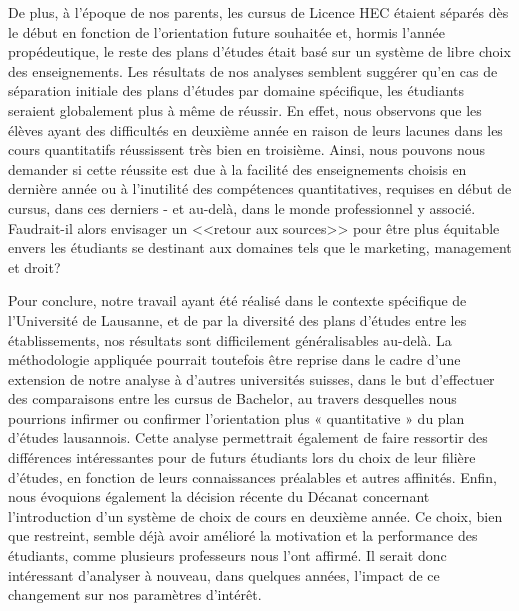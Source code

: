 De plus, à l’époque de nos parents, les cursus de Licence HEC étaient séparés dès le début en fonction de l’orientation future souhaitée et, hormis l'année propédeutique, le reste des plans d'études était basé sur un système de libre choix des enseignements. Les résultats de nos analyses semblent suggérer qu’en cas de séparation initiale des plans d’études par domaine spécifique, les étudiants seraient globalement plus à même de réussir. En effet, nous observons que les élèves ayant des difficultés en deuxième année en raison de leurs lacunes dans les cours quantitatifs réussissent très bien en troisième. Ainsi, nous pouvons nous demander si cette réussite est due à la facilité des enseignements choisis en dernière année ou à l'inutilité des compétences quantitatives, requises en début de cursus, dans ces derniers - et au-delà, dans le monde professionnel y associé. Faudrait-il alors envisager un <<retour aux sources>> pour être plus équitable envers les étudiants se destinant aux domaines tels que le marketing, management et droit?

Pour conclure, notre travail ayant été réalisé dans le contexte spécifique de l’Université de Lausanne, et de par la diversité des plans d’études entre les établissements, nos résultats sont difficilement généralisables au-delà. La méthodologie appliquée pourrait toutefois être reprise dans le cadre d’une extension de notre analyse à d’autres universités suisses, dans le but d’effectuer des comparaisons entre les cursus de Bachelor, au travers desquelles nous pourrions infirmer ou confirmer l’orientation plus « quantitative » du plan d’études lausannois. Cette analyse permettrait également de faire ressortir des différences intéressantes pour de futurs étudiants lors du choix de leur filière d’études, en fonction de leurs connaissances préalables et autres affinités. Enfin, nous évoquions également la décision récente du Décanat concernant l’introduction d’un système de choix de cours en deuxième année. Ce choix, bien que restreint, semble déjà avoir amélioré la motivation et la performance des étudiants, comme plusieurs professeurs nous l’ont affirmé. Il serait donc intéressant d’analyser à nouveau, dans quelques années, l’impact de ce changement sur nos paramètres d’intérêt.
